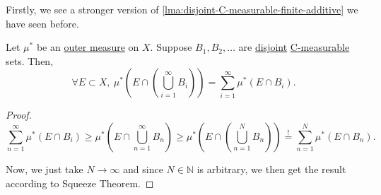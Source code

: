 Firstly, we see a stronger version of \autoref{lma:disjoint-C-measurable-finite-additive} we have seen before.
\begin{lemma}\label{lma:disjoint-C-measurable-infinite-additive}
	Let \(\mu^{\ast} \) be an \hyperref[def:outer-measure]{outer measure} on \(X\). Suppose \(B_1, B_2, \dots\) are \underline{disjoint} \hyperref[def:C-measurable]{C-measurable} sets.
	Then,
	\[
		\forall E\subset X,\ \mu^{\ast} \left(E\cap \left(\bigcup_{i=1}^{\infty} B_{i}\right)\right) = \sum_{i=1}^{\infty} \mu^{\ast} \left(E\cap B_i\right).
	\]
\end{lemma}
\begin{proof}
	\[
		\sum_{n=1}^{\infty} \mu^{\ast} (E\cap B_{i}) \geq \mu^{\ast} \left(E\cap \bigcup_{n=1}^{\infty} B_{n}\right) \geq\mu^{\ast} \left(E\cap \left(\bigcup_{n=1}^{N} B_{n}\right)\right) \overset{\hyperref[lma:disjoint-C-measurable-finite-additive]{!}}{=} \sum_{n=1}^{N} \mu^{\ast} \left(E\cap B_n\right).
	\]

	Now, we just take \(N\to \infty \) and since \(N\in\mathbb{N} \) is arbitrary, we then get the result according to Squeeze Theorem.
\end{proof}

